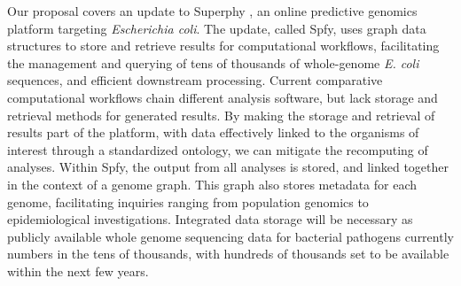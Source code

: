 \documentclass[a4paper, onecolumn]{NAR}
\begin{document}
Our proposal covers an update to Superphy \cite{whiteside2016superphy}, an online predictive genomics platform targeting \textit{Escherichia coli}.
The update, called Spfy, uses graph data structures to store and retrieve results for computational workflows, facilitating the management and querying of tens of thousands of whole-genome \textit{E. coli} sequences, and efficient downstream processing.
Current comparative computational workflows chain different analysis software, but lack storage and retrieval methods for generated results.
By making the storage and retrieval of results part of the platform, with data effectively linked to the organisms of interest through a standardized ontology, we can mitigate the recomputing of analyses.
Within Spfy, the output from all analyses is stored, and linked together in the context of a genome graph. This graph also stores metadata for each genome, facilitating inquiries ranging from population genomics to epidemiological investigations.
Integrated data storage will be necessary as publicly available whole genome sequencing data for bacterial pathogens currently numbers in the tens of thousands, with hundreds of thousands set to be available within the next few years. \par
\end{document}
